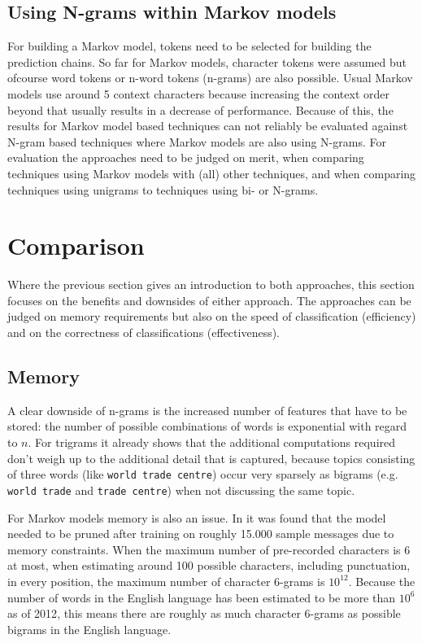 \documentclass[runningheads,a4paper]{llncs}
\begin{document}
\subsection{Using N-grams within Markov models}
For building a Markov model, tokens need to be selected for building the prediction chains. So 
far for Markov models, character tokens were assumed but ofcourse word tokens or n-word tokens 
(n-grams) are also possible. Usual Markov models use around 5 context characters because
increasing the context order beyond that usually results in a decrease of performance\cite{teahan2000}.
Because of this, the results for Markov model based techniques can not reliably be evaluated against
N-gram based techniques where Markov models are also using N-grams. For evaluation the approaches
need to be judged on merit, when comparing techniques using Markov models with (all) other techniques,
and when comparing techniques using unigrams to techniques using bi- or N-grams.

\section{Comparison}
Where the previous section gives an introduction to both approaches, this section focuses on the 
benefits and downsides of either approach. The approaches can be judged on memory requirements but 
also on the speed of classification (efficiency) and on the correctness of classifications (effectiveness).

\subsection{Memory}
A clear downside of n-grams is the increased number of features that have to be stored: 
the number of possible combinations of words is exponential with regard to $n$. For 
trigrams it already shows that the additional computations required don't weigh up 
to the additional detail that is captured, because topics consisting of three 
words (like \texttt{world trade centre}) occur very sparsely as bigrams (e.g. 
\texttt{world trade} and \texttt{trade centre}) when not discussing the same 
topic\cite{2007systematic}.

For Markov models memory is also an issue. In \cite{2005markovcharacter} it was found that the model
needed to be pruned after training on roughly 15.000 sample messages due to memory constraints.
When the maximum number of pre-recorded characters is 6 at most, when estimating around 100 possible
characters, including punctuation, in every position, the maximum number of character 6-grams is $10^{12}$.
Because the number of words in the English language has been estimated to be more than $10^6$ as of 2012\cite{2012english},
this means there are roughly as much character 6-grams as possible bigrams in the English language.
\end{document}
